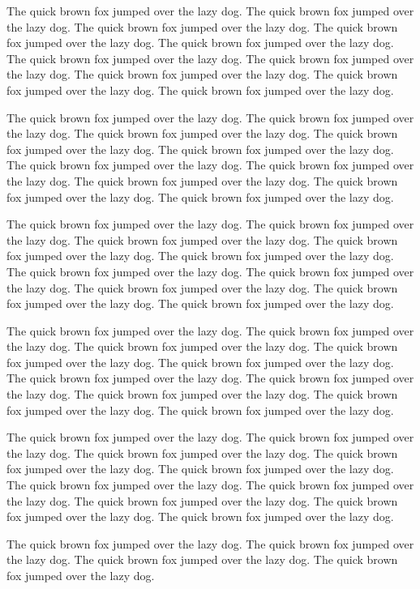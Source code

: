 \documentclass[
  12pt]{article}
\begin{document}
The quick brown fox jumped over the lazy dog. The quick brown fox jumped
over the lazy dog. The quick brown fox jumped over the lazy dog. The
quick brown fox jumped over the lazy dog. The quick brown fox jumped
over the lazy dog. The quick brown fox jumped over the lazy dog. The
quick brown fox jumped over the lazy dog. The quick brown fox jumped
over the lazy dog. The quick brown fox jumped over the lazy dog. The
quick brown fox jumped over the lazy dog.

The quick brown fox jumped over the lazy dog. The quick brown fox jumped
over the lazy dog. The quick brown fox jumped over the lazy dog. The
quick brown fox jumped over the lazy dog. The quick brown fox jumped
over the lazy dog. The quick brown fox jumped over the lazy dog. The
quick brown fox jumped over the lazy dog. The quick brown fox jumped
over the lazy dog. The quick brown fox jumped over the lazy dog. The
quick brown fox jumped over the lazy dog.

The quick brown fox jumped over the lazy dog. The quick brown fox jumped
over the lazy dog. The quick brown fox jumped over the lazy dog. The
quick brown fox jumped over the lazy dog. The quick brown fox jumped
over the lazy dog. The quick brown fox jumped over the lazy dog. The
quick brown fox jumped over the lazy dog. The quick brown fox jumped
over the lazy dog. The quick brown fox jumped over the lazy dog. The
quick brown fox jumped over the lazy dog.

The quick brown fox jumped over the lazy dog. The quick brown fox jumped
over the lazy dog. The quick brown fox jumped over the lazy dog. The
quick brown fox jumped over the lazy dog. The quick brown fox jumped
over the lazy dog. The quick brown fox jumped over the lazy dog. The
quick brown fox jumped over the lazy dog. The quick brown fox jumped
over the lazy dog. The quick brown fox jumped over the lazy dog. The
quick brown fox jumped over the lazy dog.

The quick brown fox jumped over the lazy dog. The quick brown fox jumped
over the lazy dog. The quick brown fox jumped over the lazy dog. The
quick brown fox jumped over the lazy dog. The quick brown fox jumped
over the lazy dog. The quick brown fox jumped over the lazy dog. The
quick brown fox jumped over the lazy dog. The quick brown fox jumped
over the lazy dog. The quick brown fox jumped over the lazy dog. The
quick brown fox jumped over the lazy dog.

The quick brown fox jumped over the lazy dog. The quick brown fox jumped
over the lazy dog. The quick brown fox jumped over the lazy dog. The
quick brown fox jumped over the lazy dog.
\end{document}
